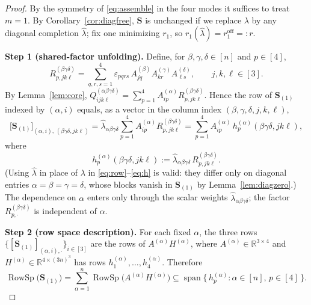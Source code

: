 \begin{proof}
By the symmetry of \eqref{eq:assemble} in the four modes it suffices to treat $m=1$. By
Corollary~\ref{cor:diagfree}, $\mathbf S$ is unchanged if we replace $\lambda$ by any
diagonal completion $\widehat\lambda$; fix one minimizing $r_1$, so $r_1(\widehat\lambda)
=r_1^{\mathrm{off}}=:r$.

\medskip\noindent\textbf{Step 1 (shared-factor unfolding).}
Define, for $\beta,\gamma,\delta\in[n]$ and $p\in[4]$,
\begin{equation}\label{eq:R}
R^{(\beta\gamma\delta)}_{p,jk\ell}
=\sum_{q,r,s=1}^4\varepsilon_{pqrs}\,
A^{(\beta)}_{jq}A^{(\gamma)}_{kr}A^{(\delta)}_{\ell s},
\qquad j,k,\ell\in[3].
\end{equation}
By Lemma~\ref{lem:core}, $Q^{(\alpha\beta\gamma\delta)}_{ijk\ell}
=\sum_{p=1}^4 A^{(\alpha)}_{ip}R^{(\beta\gamma\delta)}_{p,jk\ell}$. Hence the row of
$\mathbf S_{(1)}$ indexed by $(\alpha,i)$ equals, as a vector in the column index
$(\beta,\gamma,\delta,j,k,\ell)$,
\begin{equation}\label{eq:row}
\big[\mathbf S_{(1)}\big]_{(\alpha,i),\,(\beta\gamma\delta,jk\ell)}
=\widehat\lambda_{\alpha\beta\gamma\delta}\sum_{p=1}^4 A^{(\alpha)}_{ip}
R^{(\beta\gamma\delta)}_{p,jk\ell}
=\sum_{p=1}^4 A^{(\alpha)}_{ip}\,h^{(\alpha)}_p(\beta\gamma\delta,jk\ell),
\end{equation}
where
\begin{equation}\label{eq:h}
h^{(\alpha)}_p(\beta\gamma\delta,jk\ell)
:=\widehat\lambda_{\alpha\beta\gamma\delta}\,R^{(\beta\gamma\delta)}_{p,jk\ell}.
\end{equation}
(Using $\widehat\lambda$ in place of $\lambda$ in \eqref{eq:row}–\eqref{eq:h} is valid:
they differ only on diagonal entries $\alpha=\beta=\gamma=\delta$, whose blocks vanish in
$\mathbf S_{(1)}$ by Lemma~\ref{lem:diagzero}.) The dependence on $\alpha$ enters only
through the scalar weights $\widehat\lambda_{\alpha\beta\gamma\delta}$; the factor
$R^{(\beta\gamma\delta)}_{p,\cdot}$ is independent of $\alpha$.

\medskip\noindent\textbf{Step 2 (row space description).}
For each fixed $\alpha$, the three rows $\{[\mathbf S_{(1)}]_{(\alpha,i),\cdot}\}_{i\in[3]}$
are the rows of $A^{(\alpha)}H^{(\alpha)}$, where $A^{(\alpha)}\in\mathbb R^{3\times4}$ and
$H^{(\alpha)}\in\mathbb R^{4\times(3n)^3}$ has rows $h^{(\alpha)}_1,\dots,h^{(\alpha)}_4$.
Therefore
\begin{equation}\label{eq:rowspace}
\operatorname{RowSp}\big(\mathbf S_{(1)}\big)
=\sum_{\alpha=1}^n\operatorname{RowSp}\!\big(A^{(\alpha)}H^{(\alpha)}\big)
\subseteq\operatorname{span}\big\{\,h^{(\alpha)}_p:\alpha\in[n],\,p\in[4]\,\big\}.
\end{equation}


\end{proof}
